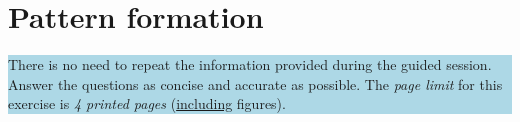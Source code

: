 \chapter{Pattern formation}

\begin{center}
\colorbox{LightBlue}{\parbox{1\textwidth}{ There is no need to repeat the information provided during the guided session. Answer the questions as concise and accurate as possible. The \textit{page limit} for this exercise is \textit{4 printed pages} (\underline{including} figures).}} %
\end{center}




